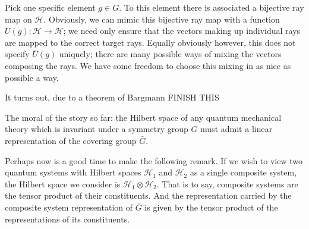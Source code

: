 \documentclass[a4paper]{report}
\theoremstyle{definition}
\theoremstyle{plain}
\theoremstyle{remark}
\begin{document}
Pick one specific element $g \in G$. To this element there is associated a bijective ray map on $\mathscr{H}$. Obviously, we can mimic this bijective ray map with a function $\bar{U}(g)\colon \mathscr{H} \to \mathscr{H}$; we need only ensure that the vectors making up individual rays are mapped to the correct target rays. Equally obviously however, this does not specify $\bar{U}(g)$ uniquely; there are many possible ways of mixing the vectors composing the rays. We have some freedom to choose this mixing in as nice as possible a way.

It turns out, due to a theorem of Bargmann {\color{red}FINISH THIS}

% 
% 
% 

The moral of the story so far: the Hilbert space of any quantum mechanical theory which is invariant under a symmetry group $G$ must admit a linear representation of the covering group $\bar{G}$.

Perhaps now is a good time to make the following remark. If we wish to view two quantum systems with Hilbert spaces $\mathscr{H}_{1}$ and $\mathscr{H}_{2}$ as a single composite system, the Hilbert space we consider is $\mathscr{H}_{1} \otimes \mathscr{H}_{2}$. That is to say, composite systems are the tensor product of their constituents. And the representation carried by the composite system representation of $\bar{G}$ is given by the tensor product of the representations of its constituents.
\end{document}
